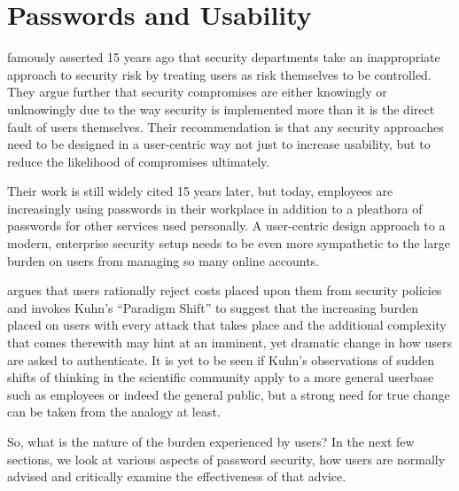 \documentclass{report}
\begin{document}

\section{Passwords and Usability}

\cite{adams1999users} famously asserted 15 years ago that security
departments take an inappropriate approach to security risk
by treating users as risk themselves to be controlled. They
argue further that security compromises are either knowingly
or unknowingly due to the way security is implemented more than
it is the direct fault of users themselves. Their recommendation
is that any security approaches need to be designed in
a user-centric way not just to increase usability, but to
reduce the likelihood of compromises ultimately.

Their work is still widely cited 15 years later, but
today, employees are increasingly using passwords in their
workplace in addition to a pleathora of passwords for
other services used personally. A user-centric design
approach to a modern, enterprise security setup needs to
be even more sympathetic to the large burden on users
from managing so many online accounts.

\cite{herley2009so} argues that users rationally reject costs
placed upon them from security policies and invokes Kuhn's
``Paradigm Shift''\parencite{kuhn1962structure} to suggest
that the increasing burden placed on users with every attack
that takes place and the additional complexity that comes
therewith may hint at an imminent, yet dramatic change in
how users are asked to authenticate. It is yet to be seen
if Kuhn's observations of sudden shifts of thinking
in the scientific community apply to a more general
userbase such as employees or indeed the general public, but
a strong need for true change can be taken from the analogy
at least.

So, what is the nature of the burden experienced by users?
In the next few sections, we look at various aspects
of password security, how users are normally advised
and critically examine the effectiveness of that advice.
\end{document}
